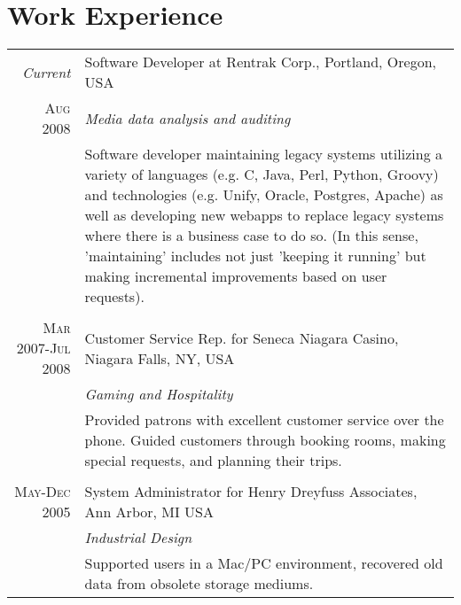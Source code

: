 \documentclass[a4paper,10pt]{article}
\begin{document}
\section{Work Experience}
\begin{tabular}{r|p{11cm}}
    \emph{Current}      & Software Developer at Rentrak Corp., Portland, Oregon, USA\\
    \textsc{Aug 2008}   & \emph{Media data analysis and auditing}\\
                        & \fontsize{9pt}{10pt}\selectfont
                                        Software developer maintaining legacy systems utilizing a variety of languages
                                        (e.g. C, Java, Perl, Python, Groovy) and technologies (e.g. Unify, Oracle,
                                        Postgres, Apache) as well as developing new webapps to replace legacy systems
                                        where there is a business case to do so. (In this sense, 'maintaining' includes
                                        not just 'keeping it running' but making incremental improvements based on user
                                        requests).\\
\multicolumn{2}{c}{}\\
    \textsc{Mar 2007-Jul 2008}   & Customer Service Rep. for Seneca Niagara Casino, Niagara Falls, NY, USA\\
                                    &\emph{Gaming and Hospitality}\\
                                    & \fontsize{9pt}{10pt}\selectfont
                                                    Provided patrons with excellent customer service over the phone. Guided
                                                    customers through booking rooms, making special requests, and planning their
                                                    trips.\\
\multicolumn{2}{c}{}\\
    \textsc{May-Dec 2005}   & System Administrator for Henry Dreyfuss Associates, Ann Arbor, MI USA\\
                            &\emph{Industrial Design}\\
                            & \fontsize{9pt}{10pt}\selectfont
                                                    Supported users in a Mac/PC environment, recovered old data from obsolete
                                                    storage mediums.\\
\end{tabular}
\end{document}
